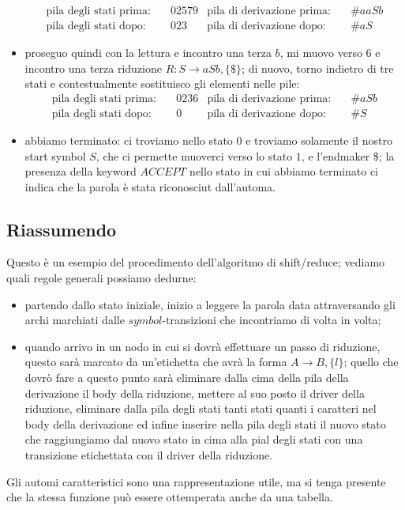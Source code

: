\documentclass[class=book, crop=false, oneside, 12pt]{standalone}
\begin{document}
\begin{itemize}
    \begin{align*}
        \textrm{pila degli stati prima:} &\quad 02579 & \textrm{pila di derivazione prima:} &\quad \#aaSb \\
        \textrm{pila degli stati dopo:} &\quad 023 & \textrm{pila di derivazione dopo:} &\quad \#aS
    \end{align*}
    \item proseguo quindi con la lettura e incontro una terza \(b\), mi muovo verso \(6\) e incontro una terza riduzione \(R: S \to aSb, \{\$\}\); di nuovo, torno indietro di tre stati e contestualmente sostituisco gli elementi nelle pile: 
    \begin{align*}
        \textrm{pila degli stati prima:} &\quad 0236 & \textrm{pila di derivazione prima:} &\quad \#aSb \\
        \textrm{pila degli stati dopo:} &\quad 0 & \textrm{pila di derivazione dopo:} &\quad \#S
    \end{align*}
    \item abbiamo terminato: ci troviamo nello stato \(0\) e troviamo solamente il nostro start symbol \(S\), che ci permette  muoverci verso lo stato \(1\), e l'endmaker \$; la presenza della keyword \(ACCEPT\) nello stato in cui abbiamo terminato ci indica che la parola è stata riconosciut dall'automa.
\end{itemize}

\subsection{Riassumendo}
Questo è un esempio del procedimento dell'algoritmo di shift/reduce; vediamo quali regole generali possiamo dedurne:
\begin{itemize}
    \item partendo dallo stato iniziale, inizio a leggere la parola data attraversando gli archi marchiati dalle \(symbol\)-transizioni che incontriamo di volta in volta;
    \item quando arrivo in un nodo in cui si dovrà effettuare un passo di riduzione, questo sarà marcato da un'etichetta che avrà la forma \(A \to B, \{l\}\); quello che dovrò fare a questo punto sarà eliminare dalla cima della pila della derivazione il body della riduzione, mettere al suo posto il driver della riduzione, eliminare dalla pila degli stati tanti stati quanti i caratteri nel body della derivazione ed infine inserire nella pila degli stati il nuovo stato che raggiungiamo dal nuovo stato in cima alla pial degli stati con una transizione etichettata con il driver della riduzione.
\end{itemize}
Gli automi caratteristici sono una rappresentazione utile, ma si tenga presente che la stessa funzione può essere ottemperata anche da una tabella.
\end{document}
